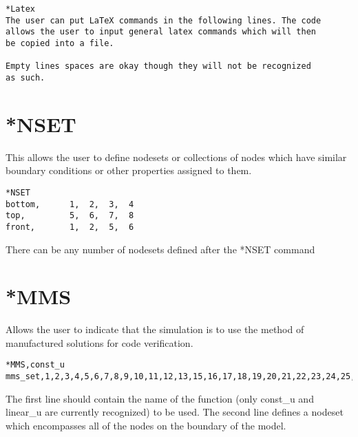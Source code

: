 \documentclass{asme2ej}
\begin{document}
\begin{verbatim}
*Latex
The user can put LaTeX commands in the following lines. The code
allows the user to input general latex commands which will then 
be copied into a file.

Empty lines spaces are okay though they will not be recognized 
as such.
\end{verbatim}

\section{*NSET}

This allows the user to define nodesets or collections of nodes which have similar boundary conditions or other properties assigned to them.

\begin{verbatim}
*NSET
bottom,      1,  2,  3,  4
top,         5,  6,  7,  8
front,       1,  2,  5,  6
\end{verbatim}

There can be any number of nodesets defined after the *NSET command

\section{*MMS}

Allows the user to indicate that the simulation is to use the method of manufactured solutions for code verification.

\begin{verbatim}
*MMS,const_u
mms_set,1,2,3,4,5,6,7,8,9,10,11,12,13,15,16,17,18,19,20,21,22,23,24,25,26,27
\end{verbatim}

The first line should contain the name of the function (only const\_u and linear\_u are currently recognized) to be used. The second line defines a nodeset which encompasses all of the nodes on the boundary of the model.

\FloatBarrier



\end{document}
